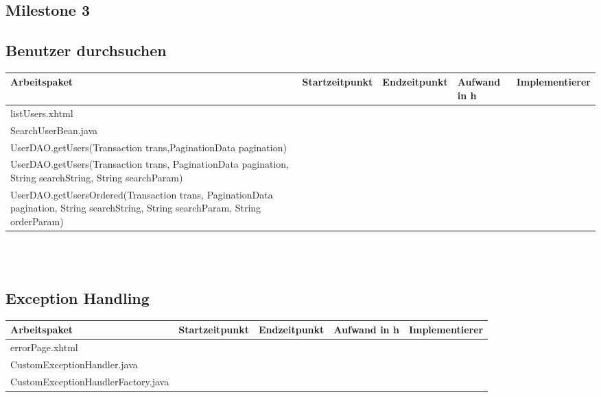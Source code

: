 \begin{landscape}
	\section{Milestone 3}	
	
	\subsection{Benutzer durchsuchen}
	\begin{tabular}{|p{10cm}|p{4cm}|p{3cm}|p{3cm}|p{3cm}|}
		\hline  \textbf{Arbeitspaket} & \textbf{Startzeitpunkt} & \textbf{Endzeitpunkt} & \textbf{Aufwand in h} & \textbf{Implementierer} \\ 
		\hline   listUsers.xhtml                                              &                            &                             &                     &\\
		\hline   SearchUserBean.java                                          &                            &                             &                     &\\
		\hline   UserDAO.getUsers(Transaction trans,PaginationData pagination)&                            &                             &                     &\\
		\hline   UserDAO.getUsers(Transaction trans, PaginationData pagination, String searchString, String searchParam)&                            &                             &                     &\\ 
		\hline   UserDAO.getUsersOrdered(Transaction trans, PaginationData pagination, String searchString, String searchParam, String orderParam)   &                            &                             &                     &\\                                 
		\hline 
	\end{tabular} \ \\
	\ \\
	
	\subsection{Exception Handling}
	\begin{tabular}{|p{10cm}|p{4cm}|p{3cm}|p{3cm}|p{3cm}|}
		\hline  \textbf{Arbeitspaket} & \textbf{Startzeitpunkt} & \textbf{Endzeitpunkt} & \textbf{Aufwand in h} & \textbf{Implementierer} \\ 
		\hline   errorPage.xhtml                                       &                            &                             &                     &\\
		\hline   CustomExceptionHandler.java                           &                            &                             &                     &\\
		\hline   CustomExceptionHandlerFactory.java                    &                            &                             &                     &\\
		\hline 
	\end{tabular} \ \\
	\ \\	
	

\end{landscape}
